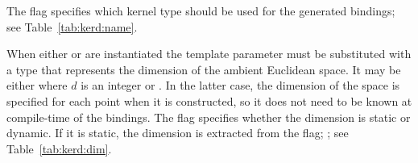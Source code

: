 The \cmake{} flag  specifies which
kernel type should be used for the generated bindings; see
Table~\ref{tab:kerd:name}.

\begin{table}[!htp]
  \caption{$d$-dimensional Kernel name options.}
  \centering{}
 \label{tab:kerd:name}
\end{table}

When either  or
 are instantiated the template
parameter must be substituted with a type that represents the
dimension of the ambient Euclidean space. It may be either
 where $d$ is an integer or
. In the latter case, the
dimension of the space is specified for each point when it is
constructed, so it does not need to be known at compile-time of the
bindings. The \cmake{}  flag
specifies whether the dimension is static or dynamic. If it is static,
the dimension is extracted from the \cmake{}
 \cmake{} flag; ; see
Table~\ref{tab:kerd:dim}.

\begin{table}[!htp]
  \caption{$d$-dimensional Kernel dimension tag options.}
  \centering{}
 \label{tab:kerd:dim}
\end{table}

